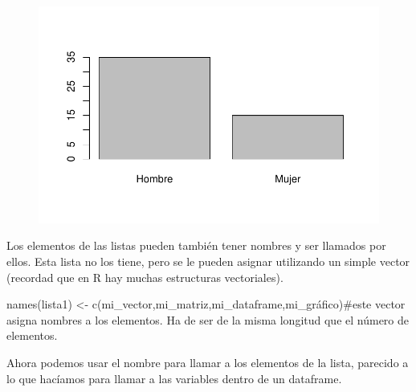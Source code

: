 \documentclass[
  letterpaper,
  DIV=11,
  numbers=noendperiod]{scrreprt}
\newenvironment{Shaded}{\begin{snugshade}}{\end{snugshade}}
\newcommand{\AttributeTok}[1]{\textcolor[rgb]{0.40,0.45,0.13}{#1}}
\newcommand{\CommentTok}[1]{\textcolor[rgb]{0.37,0.37,0.37}{#1}}
\newcommand{\DecValTok}[1]{\textcolor[rgb]{0.68,0.00,0.00}{#1}}
\newcommand{\FunctionTok}[1]{\textcolor[rgb]{0.28,0.35,0.67}{#1}}
\newcommand{\NormalTok}[1]{\textcolor[rgb]{0.00,0.23,0.31}{#1}}
\newcommand{\OtherTok}[1]{\textcolor[rgb]{0.00,0.23,0.31}{#1}}
\newcommand{\SpecialCharTok}[1]{\textcolor[rgb]{0.37,0.37,0.37}{#1}}
\newcommand{\StringTok}[1]{\textcolor[rgb]{0.13,0.47,0.30}{#1}}
\begin{document}
\begin{figure}[H]

{\centering \includegraphics{./PR_1_lect_files/figure-pdf/unnamed-chunk-6-1.pdf}

}

\end{figure}

Los elementos de las listas pueden también tener nombres y ser llamados
por ellos. Esta lista no los tiene, pero se le pueden asignar utilizando
un simple vector (recordad que en R hay muchas estructuras vectoriales).

\begin{Shaded}
\begin{Highlighting}[]
\FunctionTok{names}\NormalTok{(lista1) }\OtherTok{\textless{}{-}} \FunctionTok{c}\NormalTok{(}\StringTok{\textquotesingle{}mi\_vector\textquotesingle{}}\NormalTok{,}\StringTok{\textquotesingle{}mi\_matriz\textquotesingle{}}\NormalTok{,}\StringTok{\textquotesingle{}mi\_dataframe\textquotesingle{}}\NormalTok{,}\StringTok{\textquotesingle{}mi\_gráfico\textquotesingle{}}\NormalTok{)}\CommentTok{\#este vector asigna nombres a los elementos. Ha de ser de la misma longitud que el número de elementos.}
\end{Highlighting}
\end{Shaded}

Ahora podemos usar el nombre para llamar a los elementos de la lista,
parecido a lo que hacíamos para llamar a las variables dentro de un
dataframe.

\begin{Shaded}
\end{Shaded}
\end{document}
